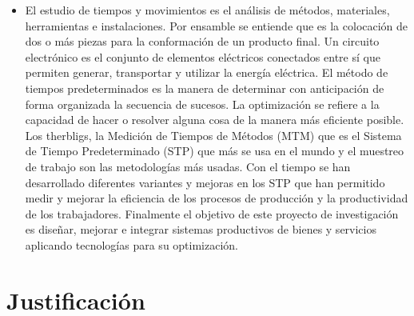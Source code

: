     \begin{itemize}
    \item El estudio de tiempos y movimientos es el análisis de métodos, materiales, herramientas e instalaciones.\cite{RAE}
    Por ensamble se entiende que es la colocación de dos o más piezas para la conformación de un producto final.\cite{RAE}
    Un circuito electrónico es el conjunto de elementos eléctricos conectados entre sí que permiten generar, transportar y utilizar la energía eléctrica.\cite{RAE}
    El método de tiempos predeterminados es la manera de determinar con anticipación de forma organizada la secuencia de sucesos.\cite{RAE} 
    La optimización se refiere a la capacidad de hacer o resolver alguna cosa de la manera más eficiente posible.\cite{RAE}
    Los therbligs, la Medición de Tiempos de Métodos (MTM) que es el Sistema de Tiempo Predeterminado (STP) que más se usa en el mundo y el muestreo de trabajo son las metodologías más usadas. Con el tiempo se han desarrollado diferentes variantes y mejoras en los STP que han permitido medir y mejorar la eficiencia de los procesos de producción y la productividad de los trabajadores. Finalmente el objetivo de este proyecto de investigación es diseñar, mejorar e integrar sistemas productivos de bienes y servicios aplicando tecnologías para su optimización.
    \end{itemize}
    
    \section{Justificación}
    
